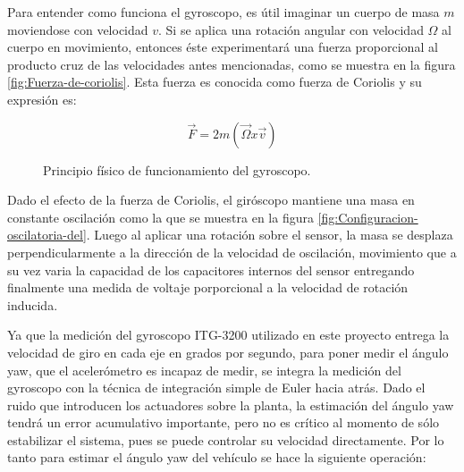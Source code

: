 \documentclass[\main/main.tex]{subfiles}
\begin{document}
Para entender como funciona el gyroscopo, es útil imaginar un cuerpo
de masa $m$ moviendose con velocidad $v$. Si se aplica una rotación
angular con velocidad $\Omega$ al cuerpo en movimiento, entonces
éste experimentará una fuerza proporcional al producto cruz de las
velocidades antes mencionadas, como se muestra en la figura \ref{fig:Fuerza-de-coriolis}.
Esta fuerza es conocida como fuerza de Coriolis y su expresión es: 

\begin{equation}
\overrightarrow{F}=2m(\overrightarrow{\Omega}x\overrightarrow{v})
\end{equation}


\begin{figure}[H]
\noindent \begin{centering}
\par\end{centering}
\caption{Principio físico de funcionamiento del gyroscopo.}
\end{figure}

Dado el efecto de la fuerza de Coriolis, el giróscopo mantiene una
masa en constante oscilación como la que se muestra en la figura \ref{fig:Configuracion-oscilatoria-del}.
Luego al aplicar una rotación sobre el sensor, la masa se desplaza
perpendicularmente a la dirección de la velocidad de oscilación, movimiento
que a su vez varia la capacidad de los capacitores internos del sensor
entregando finalmente una medida de voltaje porporcional a la velocidad
de rotación inducida.

Ya que la medición del gyroscopo ITG-3200 utilizado en este proyecto
entrega la velocidad de giro en cada eje en grados por segundo, para
poner medir el ángulo yaw, que el acelerómetro es incapaz de medir, se
integra la medición del gyroscopo con la técnica de integración simple
de Euler hacia atrás. Dado el ruido que introducen los actuadores
sobre la planta, la estimación del ángulo yaw tendrá un error acumulativo
importante, pero no es crítico al momento de sólo estabilizar el sistema,
pues se puede controlar su velocidad directamente. Por lo tanto para
estimar el ángulo yaw del vehículo se hace la siguiente operación:
\end{document}
